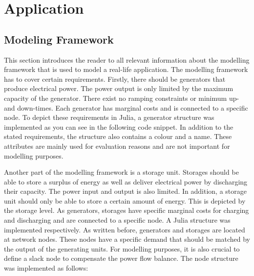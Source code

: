 \section{Application}


\subsection{Modeling Framework}
\label{sec:app:mod-framework}

This section introduces the reader to all relevant information about the modelling framework that is used to model a real-life application. The modelling framework has to cover certain requirements. Firstly, there should be generators that produce electrical power. The power output is only limited by the maximum capacity of the generator. There exist no ramping constraints or minimum up- and down-times. Each generator has marginal costs and is connected to a specific node. To depict these requirements in Julia, a generator structure was implemented as you can see in the following code snippet. In addition to the stated requirements, the structure also contains a colour and a name. These attributes are mainly used for evaluation reasons and are not important for modelling purposes. 



Another part of the modelling framework is a storage unit. Storages should be able to store a surplus of energy as well as deliver electrical power by discharging their capacity. The power input and output is also limited. In addition, a storage unit should only be able to store a certain amount of energy. This is depicted by the storage level. As generators, storages have specific marginal costs for charging and discharging and are connected to a specific node. A Julia structure was implemented respectively. As written before, generators and storages are located at network nodes. These nodes have a specific demand that should be matched by the output of the generating units. For modelling purposes, it is also crucial to define a slack node to compensate the power flow balance. The node structure was implemented as follows:



